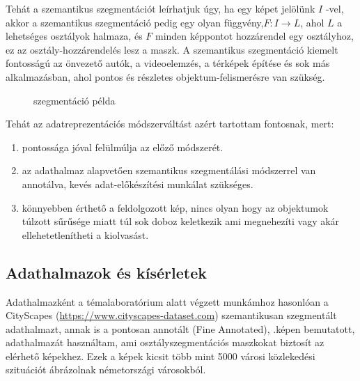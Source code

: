 \documentclass[12pt,oneside,a4paper]{article}
\theoremstyle{remark}
\begin{document}
	Tehát a szemantikus szegmentációt leírhatjuk úgy, ha egy képet jelölünk \(I\) -vel, akkor a szemantikus
	szegmentáció pedig egy olyan függvény,\(F: I \rightarrow L\), ahol \(L\) a lehetséges osztályok halmaza, és \(F\) minden
	képpontot hozzárendel egy osztályhoz, ez az osztály-hozzárendelés lesz a maszk.
	A szemantikus szegmentáció kiemelt fontosságú az önvezető autók, a
	videoelemzés, a térképek építése és sok más
	alkalmazásban, ahol pontos és részletes objektum-felismerésre van szükség.
	\begin{figure}[ht]
		\centering
		\caption{szegmentáció példa}\label{fig:szegmentation example}
	\end{figure}
	Tehát az adatreprezentációs módszerváltást azért tartottam fontosnak, mert:
	\begin{enumerate}
		\item  pontossága jóval felülmúlja az előző módszerét.
		\item  az adathalmaz alapvetően szemantikus szegmentálási módszerrel van annotálva,
		kevés adat-előkészítési munkálat  szükséges.
		\item  könnyebben érthető a feldolgozott kép, nincs olyan hogy az objektumok túlzott sűrűsége miatt túl sok
		doboz keletkezik ami megnehezíti vagy akár ellehetetlenítheti a kiolvasást.
	\end{enumerate}
	
	
	\subsection{Adathalmazok és kísérletek}\label{subsec:adathalmazok-es-kiserletek}
	Adathalmazként a témalaboratórium alatt végzett munkámhoz hasonlóan a CityScapes
	(\url{https://www.cityscapes-dataset.com}) szemantikusan szegmentált adathalmazt, annak is a pontosan annotált
	(Fine Annotated), \label{kephivatkozas}.képen bemutatott,
	adathalmazát használtam, ami osztályszegmentációs maszkokat biztosít az elérhető képekhez.
	Ezek a képek kicsit több mint 5000 városi közlekedési szituációt ábrázolnak
	németországi városokból.
	
\end{document}
